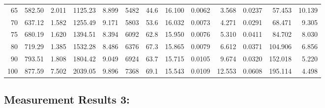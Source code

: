 \documentclass[10pt]{article}
\begin{document}
{\begin{tabular}{|r|rr|rr|rr|rr|rr|r|r|}
       65 &       582.50 &        2.011 &      1125.23 &        8.899 &         5482 &         44.6 &       16.100 &       0.0062 &        3.568 &       0.0237 &       57.453 &       10.139 \\
       70 &       637.12 &        1.582 &      1255.49 &        9.171 &         5803 &         53.6 &       16.032 &       0.0073 &        4.271 &       0.0291 &       68.471 &        9.305 \\
       75 &       680.19 &        1.620 &      1394.51 &        8.394 &         6092 &         62.8 &       15.950 &       0.0076 &        5.310 &       0.0411 &       84.702 &        8.030 \\
       80 &       719.29 &        1.385 &      1532.28 &        8.486 &         6376 &         67.3 &       15.865 &       0.0079 &        6.612 &       0.0371 &      104.906 &        6.856 \\
       90 &       793.51 &        1.808 &      1804.42 &        9.049 &         6924 &         63.7 &       15.715 &       0.0105 &        9.674 &       0.0320 &      152.018 &        5.220 \\
      100 &       877.59 &        7.502 &      2039.05 &        9.896 &         7368 &         69.1 &       15.543 &       0.0109 &       12.553 &       0.0608 &      195.114 &        4.498 \\
\hline
\end{tabular}
}



\subsection*{\large \bf Measurement Results 3:}
\end{document}
